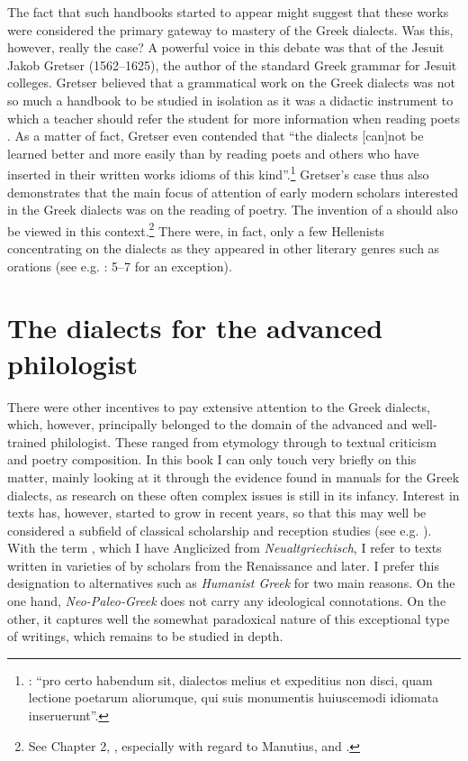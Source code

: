 The fact that such handbooks started to appear might suggest that these works were considered the primary gateway to mastery of the Greek dialects. Was this, however, really the case? A powerful voice in this debate was that of the  Jesuit Jakob Gretser (1562–1625), the author of the standard Greek grammar for Jesuit colleges. Gretser believed that a grammatical work on the Greek dialects was not so much a handbook to be studied in isolation as it was a didactic instrument to which a teacher should refer the student for more information when reading poets \citep[{\footnotesize)(}.5\textsc{\textsuperscript{v}}–\footnotesize{)(}.6\textsc{\textsuperscript{r}}]{Gretser1593}. As a matter of fact, Gretser even contended that “the dialects [can]not be learned better and more easily than by reading poets and others who have inserted in their written works idioms of this kind”.\footnote{\citet[)(.5\textsc{\textsuperscript{v}}]{Gretser1593}: “pro certo habendum sit, dialectos melius et expeditius non disci, quam lectione poetarum aliorumque, qui suis monumentis huiuscemodi idiomata inseruerunt”.} Gretser’s case thus also demonstrates that the main focus of attention of early modern scholars interested in the Greek dialects was on the reading of poetry. The invention of a  should also be viewed in this context.\footnote{See Chapter 2, , especially with regard to Manutius, and .} There were, in fact, only a few Hellenists concentrating on the dialects as they appeared in other literary genres such as orations (see e.g. \citealt{Labbe1639}: 5–7 for an exception).

\section{The dialects for the advanced philologist}\label{sec:3.2}

There were other incentives to pay extensive attention to the Greek dialects, which, however, principally belonged to the domain of the advanced and well-trained philologist. These ranged from etymology through to textual criticism and  poetry composition. In this book I can only touch very briefly on this matter, mainly looking at it through the evidence found in manuals for the Greek dialects, as research on these often complex issues is still in its infancy. Interest in  texts has, however, started to grow in recent years, so that this may well be considered a subfield of classical scholarship and reception studies (see e.g. \citealt{Pall2018}). With the term , which I have Anglicized from  \textit{Neualtgriechisch}, I refer to texts written in varieties of  by scholars from the Renaissance and later. I prefer this designation to alternatives such as \textit{Humanist Greek} for two main reasons. On the one hand, \textit{Neo-Paleo-Greek} does not carry any ideological connotations. On the other, it captures well the somewhat paradoxical nature of this exceptional type of writings, which remains to be studied in depth.


